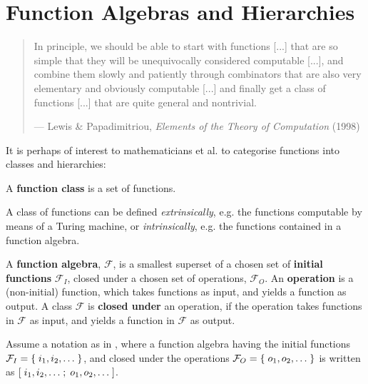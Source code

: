 \chapter{Function Algebras and Hierarchies}

\begin{quotation}

\footnotesize\sffamily\itshape

\begin{flushright}

In principle, we should be able to start with functions [...] that are so
simple that they will be unequivocally considered computable [...], and combine
them slowly and patiently through combinators that are also very elementary and
obviously computable [...] and finally get a class of functions [...] that are
quite general and nontrivial.

\smallbreak

\upshape

--- Lewis \& Papadimitriou, \emph{Elements of the Theory of Computation} (1998)

\end{flushright}

\end{quotation}

It is perhaps of interest to mathematicians et al. to categorise functions into
classes and hierarchies:

\begin{definition} A \textbf{function class} is a set of
functions.\end{definition}

A class of functions can be defined \emph{extrinsically}, e.g.  the functions
computable by means of a Turing machine, or \emph{intrinsically}, e.g. the
functions contained in a function algebra.

\begin{definition} A \textbf{function algebra}, $\mathcal{F}$, is a smallest
superset of a chosen set of \textbf{initial functions} $\mathcal{F}_I$, closed
under a chosen set of operations, $\mathcal{F}_O$. An \textbf{operation} is a
(non-initial) function, which takes functions as input, and yields a function
as output. A class $\mathcal{F}$ is \textbf{closed under} an operation, if the
operation takes functions in $\mathcal{F}$ as input, and yields a function in
$\mathcal{F}$ as output. \end{definition}

\begin{notation} Assume a notation as in \cite{clote-1999}, where a function
algebra having the initial functions $\mathcal{F}_I = \mathopen{}\left\{\mathrel{}{i_1,i_2,\ldots}\mathrel{}\right\}\mathclose{}$,
and closed under the operations $\mathcal{F}_O = \mathopen{}\left\{\mathrel{}{o_1, o_2, \ldots}\mathrel{}\right\}\mathclose{}$ is
written as $\mathopen{}\left[{\mathrel{}i_1, i_2, \ldots\mathrel{};\mathrel{}o_1, o_2, \ldots\mathrel{}}\right]\mathclose{}$.\end{notation}

